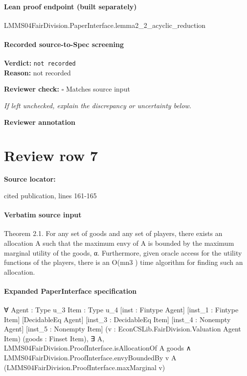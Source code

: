 \documentclass[10pt]{article}
\newcommand{\reviewerbox}{%
  \par\noindent\fbox{\parbox{0.96\linewidth}{\rule{0pt}{0.38in}}}\par
}
\newcommand{\reviewmatch}[1]{%
  \par\noindent\textbf{Reviewer check:} $\square$\; #1\par
  \noindent\emph{If left unchecked, explain the discrepancy or uncertainty below.}\par
}
\begin{document}
\paragraph{Lean proof endpoint (built separately)}\begin{ReviewVerbatim}
LMMS04FairDivision.PaperInterface.lemma2_2_acyclic_reduction
\end{ReviewVerbatim}

\paragraph{Recorded source-to-Spec screening}
\textbf{Verdict:} \texttt{not recorded}
\\
\textbf{Reason:} not recorded
\reviewmatch{Matches source input}
\noindent\textbf{Reviewer annotation}\par
\reviewerbox
\clearpage
\hypertarget{source-claim-699685670f75744b}{}
\section*{Review row 7}
\textbf{Source locator:} {\footnotesize\raggedright cited publication, lines 161-\allowbreak{}165\par}
\paragraph{Verbatim source input}
\begin{ReviewVerbatim}
Theorem 2.1. For any set of goods and any set of players, there exists an allocation A such that the maximum envy
of A is bounded by the maximum marginal utility of the
goods, α. Furthermore, given oracle access for the utility
functions of the players, there is an O(mn3 ) time algorithm
for finding such an allocation.
\end{ReviewVerbatim}


\paragraph{Expanded PaperInterface specification}
\begin{ReviewVerbatim}
∀ {Agent : Type u_3} {Item : Type u_4} [inst : Fintype Agent] [inst_1 : Fintype Item] [DecidableEq Agent]
  [inst_3 : DecidableEq Item] [inst_4 : Nonempty Agent] [inst_5 : Nonempty Item]
  (v : EconCSLib.FairDivision.Valuation Agent Item) (goods : Finset Item),
  ∃ A,
    LMMS04FairDivision.ProofInterface.isAllocationOf A goods ∧
      LMMS04FairDivision.ProofInterface.envyBoundedBy v A (LMMS04FairDivision.ProofInterface.maxMarginal v)
\end{ReviewVerbatim}
\end{document}
